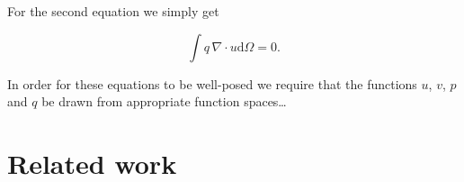 For the second equation we simply get

\begin{equation}
  \int q \, \nabla \cdot u \textrm{d}\Omega = 0.
\end{equation}

In order for these equations to be well-posed we require that the functions $u$, $v$, $p$ and $q$ be drawn from appropriate function spaces\dots








\section{Related work}  %

